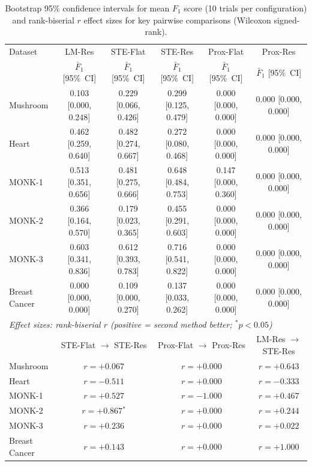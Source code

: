 \begin{table}[t]
\caption{Bootstrap 95\% confidence intervals for mean $F_1$ score
         (10 trials per configuration) and rank-biserial $r$ effect sizes
         for key pairwise comparisons (Wilcoxon signed-rank).}
\label{tab:bootstrap}
\centering
\renewcommand{\arraystretch}{1.15}
\begin{tabular}{l ccccc}
\toprule
Dataset & LM-Res & STE-Flat & STE-Res & Prox-Flat & Prox-Res \\
        & $\bar{F}_1$ [95\%~CI] & $\bar{F}_1$ [95\%~CI] & $\bar{F}_1$ [95\%~CI] & $\bar{F}_1$ [95\%~CI] & $\bar{F}_1$ [95\%~CI] \\
\midrule
Mushroom & 0.103 [0.000, 0.248] & 0.229 [0.066, 0.426] & 0.299 [0.125, 0.479] & 0.000 [0.000, 0.000] & 0.000 [0.000, 0.000] \\
Heart & 0.462 [0.259, 0.640] & 0.482 [0.274, 0.667] & 0.272 [0.080, 0.468] & 0.000 [0.000, 0.000] & 0.000 [0.000, 0.000] \\
MONK-1 & 0.513 [0.351, 0.656] & 0.481 [0.275, 0.666] & 0.648 [0.484, 0.753] & 0.147 [0.000, 0.360] & 0.000 [0.000, 0.000] \\
MONK-2 & 0.366 [0.164, 0.570] & 0.179 [0.023, 0.365] & 0.455 [0.291, 0.603] & 0.000 [0.000, 0.000] & 0.000 [0.000, 0.000] \\
MONK-3 & 0.603 [0.341, 0.836] & 0.612 [0.393, 0.783] & 0.716 [0.541, 0.822] & 0.000 [0.000, 0.000] & 0.000 [0.000, 0.000] \\
Breast Cancer & 0.000 [0.000, 0.000] & 0.109 [0.000, 0.270] & 0.137 [0.033, 0.262] & 0.000 [0.000, 0.000] & 0.000 [0.000, 0.000] \\
\midrule
\multicolumn{6}{l}{\textit{Effect sizes: rank-biserial $r$ (positive = second method better; ${}^*p<0.05$)}} \\
& \multicolumn{2}{c}{STE-Flat $\to$ STE-Res} & \multicolumn{2}{c}{Prox-Flat $\to$ Prox-Res} & LM-Res $\to$ STE-Res \\
Mushroom & \multicolumn{2}{c}{$r=+0.067$} & \multicolumn{2}{c}{$r=+0.000$} & $r=+0.643$ \\
Heart & \multicolumn{2}{c}{$r=-0.511$} & \multicolumn{2}{c}{$r=+0.000$} & $r=-0.333$ \\
MONK-1 & \multicolumn{2}{c}{$r=+0.527$} & \multicolumn{2}{c}{$r=-1.000$} & $r=+0.467$ \\
MONK-2 & \multicolumn{2}{c}{$r=+0.867$$^*$} & \multicolumn{2}{c}{$r=+0.000$} & $r=+0.244$ \\
MONK-3 & \multicolumn{2}{c}{$r=+0.236$} & \multicolumn{2}{c}{$r=+0.000$} & $r=+0.022$ \\
Breast Cancer & \multicolumn{2}{c}{$r=+0.143$} & \multicolumn{2}{c}{$r=+0.000$} & $r=+1.000$ \\
\bottomrule
\end{tabular}
\end{table}